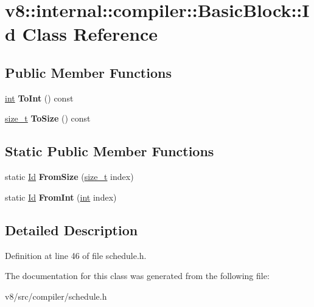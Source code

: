 \hypertarget{classv8_1_1internal_1_1compiler_1_1BasicBlock_1_1Id}{}\section{v8\+:\+:internal\+:\+:compiler\+:\+:Basic\+Block\+:\+:Id Class Reference}
\label{classv8_1_1internal_1_1compiler_1_1BasicBlock_1_1Id}
\subsection*{Public Member Functions}
\begin{DoxyCompactItemize}
\item 
\mbox{\label{classv8_1_1internal_1_1compiler_1_1BasicBlock_1_1Id_a8356d2f9171417907e0a85a959704135}} 
\mbox{\hyperlink{classint}{int}} {\bfseries To\+Int} () const
\item 
\mbox{\label{classv8_1_1internal_1_1compiler_1_1BasicBlock_1_1Id_a6a86507463e387101b86908dbbcdcf35}} 
\mbox{\hyperlink{classsize__t}{size\+\_\+t}} {\bfseries To\+Size} () const
\end{DoxyCompactItemize}
\subsection*{Static Public Member Functions}
\begin{DoxyCompactItemize}
\item 
\mbox{\label{classv8_1_1internal_1_1compiler_1_1BasicBlock_1_1Id_a4f106f6bd5dc4347eab0179ad5a703df}} 
static \mbox{\hyperlink{classv8_1_1internal_1_1compiler_1_1BasicBlock_1_1Id}{Id}} {\bfseries From\+Size} (\mbox{\hyperlink{classsize__t}{size\+\_\+t}} index)
\item 
\mbox{\label{classv8_1_1internal_1_1compiler_1_1BasicBlock_1_1Id_a8e465370cd1b216b46c84a5bb42f4f97}} 
static \mbox{\hyperlink{classv8_1_1internal_1_1compiler_1_1BasicBlock_1_1Id}{Id}} {\bfseries From\+Int} (\mbox{\hyperlink{classint}{int}} index)
\end{DoxyCompactItemize}


\subsection{Detailed Description}


Definition at line 46 of file schedule.\+h.



The documentation for this class was generated from the following file\+:\begin{DoxyCompactItemize}
\item 
v8/src/compiler/schedule.\+h\end{DoxyCompactItemize}
